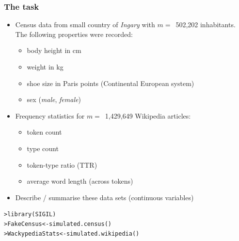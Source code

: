 \documentclass[t]{beamer} %
\begin{document}
\begin{frame}[fragile]
  \frametitle{The task}

  \begin{itemize}
  \item Census data from small country of \emph{Ingary} with $m =$~502,202
    inhabitants.  The following properties were recorded:
    \begin{itemize}
    \item body height in cm
    \item weight in kg
    \item shoe size in Paris points (Continental European system)
    \item sex (\emph{male}, \emph{female})
    \end{itemize}
  \item Frequency statistics for $m =$~1,429,649 Wikipedia articles:
    \begin{itemize}
    \item token count
    \item type count
    \item token-type ratio (TTR)
    \item average word length (across tokens)
    \end{itemize}
  \item[\hand] Describe / summarise these data sets (continuous variables)
  \end{itemize}

  \pause
  \begin{alltt}\small
    > library(SIGIL)
    > FakeCensus <- simulated.census()
    > WackypediaStats <- simulated.wikipedia()
  \end{alltt}
\end{frame}

\end{document}
